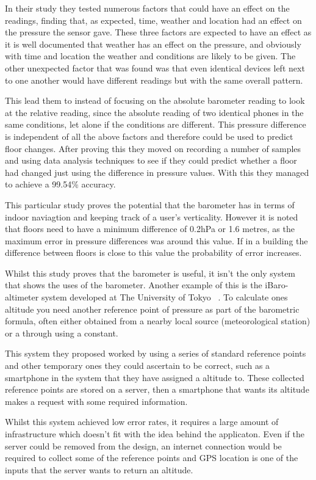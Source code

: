 \documentclass[main.tex]{subfiles}
\begin{document}
In their study they tested numerous factors that could have an effect on the readings, finding that, as expected, time, weather and location had an effect on the pressure the sensor gave. These three factors are expected to have an effect as it is well documented that weather has an effect on the pressure, and obviously with time and location the weather and conditions are likely to be given. The other unexpected factor that was found was that even identical devices left next to one another would have different readings but with the same overall pattern. ~\cite[p.2]{baro2014}

This lead them to instead of focusing on the absolute barometer reading to look at the relative reading, since the absolute reading of two identical phones in the same conditions, let alone if the conditions are different. This pressure difference is independent of all the above factors and therefore could be used to predict floor changes. After proving this they moved on recording a number of samples and using data analysis techniques to see if they could predict whether a floor had changed just using the difference in pressure values. With this they managed to achieve a 99.54\% accuracy.

This particular study proves the potential that the barometer has in terms of indoor naviagtion and keeping track of a user's verticality. However it is noted that floors need to have a minimum difference of 0.2hPa or 1.6 metres, as the maximum error in pressure differences was around this value. If in a building the difference between floors is close to this value the probability of error increases.

Whilst this study proves that the barometer is useful, it isn't the only system that shows the uses of the barometer. Another example of this is the iBaro-altimeter system developed at The University of Tokyo ~\cite{baro22014}. To calculate ones altitude you need another reference point of pressure as part of the barometric formula, often either obtained from a nearby local source (meteorological station) or a through using a constant.

This system they proposed worked by using a series of standard reference points and other temporary ones they could ascertain to be correct, such as a smartphone in the system that they have assigned a altitude to. These collected reference points are stored on a server, then a smartphone that wants its altitude makes a request with some required information.

Whilst this system achieved low error rates, it requires a large amount of infrastructure which doesn't fit with the idea behind the applicaton. Even if the server could be removed from the design, an internet connection would be required to collect some of the reference points and GPS location is one of the inputs that the server wants to return an altitude.
\end{document}
